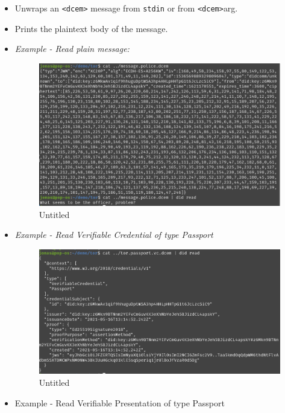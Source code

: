 \begin{itemize}
\item
  Unwraps an \lstinline!<dcem>! message from
  \lstinline!stdin! or from
  \lstinline!<dcem>!arg.
\item
  Prints the plaintext body of the message.
\item
  \emph{Example - Read plain message:}

  \begin{figure}
  \centering
  \includegraphics{User Interface f8759a9462b24d5f95cf6123d68b89ea/Untitled 7.png}
  \caption{Untitled}
  \end{figure}
\item
  \emph{Example - Read Verifiable Credential of type Passport}

  \begin{figure}
  \centering
  \includegraphics{User Interface f8759a9462b24d5f95cf6123d68b89ea/Untitled 8.png}
  \caption{Untitled}
  \end{figure}
\item
  Example - Read Verifiable Presentation of type Passport


\end{itemize}

